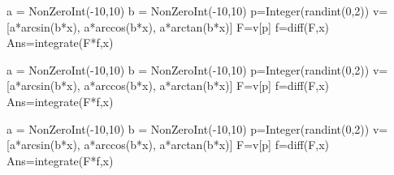 \documentclass[]{ximera}
\begin{document}

\begin{sagesilent}
a = NonZeroInt(-10,10)
b = NonZeroInt(-10,10)
p=Integer(randint(0,2))
v=[a*arcsin(b*x), a*arccos(b*x), a*arctan(b*x)]
F=v[p]
f=diff(F,x)
Ans=integrate(F*f,x)
\end{sagesilent}


\begin{sagesilent}
a = NonZeroInt(-10,10)
b = NonZeroInt(-10,10)
p=Integer(randint(0,2))
v=[a*arcsin(b*x), a*arccos(b*x), a*arctan(b*x)]
F=v[p]
f=diff(F,x)
Ans=integrate(F*f,x)
\end{sagesilent}


\begin{sagesilent}
a = NonZeroInt(-10,10)
b = NonZeroInt(-10,10)
p=Integer(randint(0,2))
v=[a*arcsin(b*x), a*arccos(b*x), a*arctan(b*x)]
F=v[p]
f=diff(F,x)
Ans=integrate(F*f,x)
\end{sagesilent}

\end{document}
